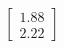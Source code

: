 \documentclass[preview]{standalone}
\begin{document}
\begin{align*}
\begin{bmatrix} 1.88 \\ 2.22 \end{bmatrix}
\end{align*}
\end{document}
